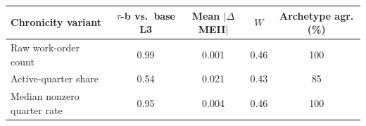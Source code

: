 \begin{tabular}{lcccc}
\toprule
Chronicity variant & $\tau$-b vs.\ base L3 & Mean $|\Delta$MEII$|$ & $W$ & Archetype agr. (\%) \\
\midrule
Raw work-order count & 0.99 & 0.001 & 0.46 & 100 \\
Active-quarter share & 0.54 & 0.021 & 0.43 & 85 \\
Median nonzero quarter rate & 0.95 & 0.004 & 0.46 & 100 \\
\bottomrule
\end{tabular}
